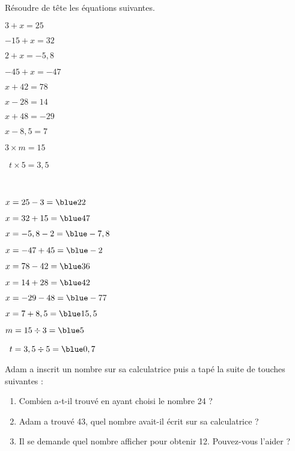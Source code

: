 \begin{colonne*exercice}
\bigskip


\begin{exercice} %
   Résoudre de tête les équations suivantes. \smallskip
   \begin{colenumerate}{2}
      \item $3+x =25$ \smallskip
      \item $-15+x =32$ \smallskip
      \item $2+x =-5,8$ \smallskip
      \item $-45+x =-47$ \smallskip
      \item $x+42 =78$ \smallskip
      \item $x-28 =14$
      \item $x+48 =-29$
      \item $x-8,5 =7$
      \item $3\times m =15$
      \item \, $t\times5 =3,5$
   \end{colenumerate}
\end{exercice}

\begin{corrige}
   \ \\ [-5mm]
   \begin{colenumerate}{2}
      \item $x =25-3 =\blue 22$
      \item $x =32+15 =\blue 47$
      \item $x =-5,8-2 =\blue -7,8$
      \item $x =-47+45 =\blue -2$
      \item $x =78-42 =\blue 36$
      \item $x =14+28 =\blue 42$
      \item $x=-29-48 =\blue -77$
      \item $x=7+8,5 =\blue 15,5$
      \item $m =15\div3 =\blue 5$
      \item \, $t =3,5\div5 =\blue 0,7$
   \end{colenumerate}
\end{corrige}

\bigskip



\bigskip

\begin{exercice} %
   Adam a inscrit un nombre sur sa calculatrice puis a
tapé la suite de touches suivantes :
   \begin{center}
      \fbox{\large$\times$} \quad {} \quad \fbox{\large$+$} \quad {}
   \end{center}
   \begin{enumerate}
      \item Combien a-t-il trouvé en ayant choisi le nombre 24 ?
      \item Adam a trouvé 43, quel nombre avait-il écrit sur sa calculatrice ?
      \item Il se demande quel nombre afficher pour obtenir 12. Pouvez-vous l'aider ?
   \end{enumerate}
\end{exercice}


\end{colonne*exercice}
